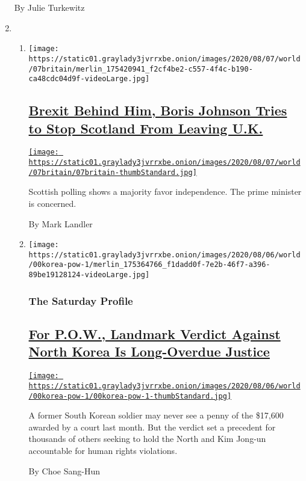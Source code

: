 \begin{enumerate}
  By Julie Turkewitz
\item
  \begin{enumerate}
  \def\labelenumii{\arabic{enumii}.}
  \item
    \texttt{[image: https://static01.graylady3jvrrxbe.onion/images/2020/08/07/world/07britain/merlin\_175420941\_f2cf4be2-c557-4f4c-b190-ca48cdc04d9f-videoLarge.jpg]}

    \hypertarget{brexit-behind-him-boris-johnson-tries-to-stop-scotland-from-leaving-uk}{%
    \subsection{\texorpdfstring{\href{/2020/08/07/world/europe/boris-johnson-scotland-ireland-independence.html}{Brexit
    Behind Him, Boris Johnson Tries to Stop Scotland From Leaving
    U.K.}}{Brexit Behind Him, Boris Johnson Tries to Stop Scotland From Leaving U.K.}}\label{brexit-behind-him-boris-johnson-tries-to-stop-scotland-from-leaving-uk}}

    \href{/2020/08/07/world/europe/boris-johnson-scotland-ireland-independence.html}{\texttt{[image: https://static01.graylady3jvrrxbe.onion/images/2020/08/07/world/07britain/07britain-thumbStandard.jpg]}}

    Scottish polling shows a majority favor independence. The prime
    minister is concerned.

    By Mark Landler
  \item
    \texttt{[image: https://static01.graylady3jvrrxbe.onion/images/2020/08/06/world/00korea-pow-1/merlin\_175364766\_f1dadd0f-7e2b-46f7-a396-89be19128124-videoLarge.jpg]}

    \hypertarget{the-saturday-profile}{%
    \subsubsection{The Saturday Profile}\label{the-saturday-profile}}

    \hypertarget{for-pow-landmark-verdict-against-north-korea-is-long-overdue-justice}{%
    \subsection{\texorpdfstring{\href{/2020/08/07/world/asia/north-korea-pow-verdict-kim.html}{For
    P.O.W., Landmark Verdict Against North Korea Is Long-Overdue
    Justice}}{For P.O.W., Landmark Verdict Against North Korea Is Long-Overdue Justice}}\label{for-pow-landmark-verdict-against-north-korea-is-long-overdue-justice}}

    \href{/2020/08/07/world/asia/north-korea-pow-verdict-kim.html}{\texttt{[image: https://static01.graylady3jvrrxbe.onion/images/2020/08/06/world/00korea-pow-1/00korea-pow-1-thumbStandard.jpg]}}

    A former South Korean soldier may never see a penny of the \$17,600
    awarded by a court last month. But the verdict set a precedent for
    thousands of others seeking to hold the North and Kim Jong-un
    accountable for human rights violations.

    By Choe Sang-Hun
  \end{enumerate}
\end{enumerate}

